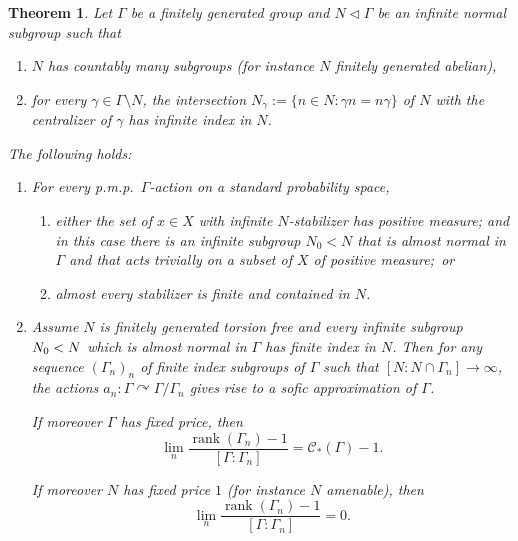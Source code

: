 \documentclass[10pt]{amsart}
\newtheorem{theo}[cdrthm]{Theorem}
\theoremstyle{definition}
\newcommand{\acting}{\curvearrowright}
\newcommand{\vraicost}{\mathscr{C}}
\DeclareMathOperator{\rank}{rank}
\newcommand{\pmp}{p.m.p.\ }
\newcommand*{\romanenumi}{\renewcommand*{\theenumi}{\roman{enumi}}}
\newcommand*{\alphenumi}{\renewcommand*{\theenumi}{\alph{enumi}}}
\begin{document}
\begin{theo}\label{th: normal subgr f subg --> rel Stuck-Zimmer}
Let $\Gamma$ be a finitely generated group and $N\triangleleft \Gamma$ be an infinite normal subgroup such that
\begin{enumerate}\alphenumi
\item \label{it : assumpt count many sbgr}
$N$ has countably many subgroups (for instance $N$ finitely generated abelian),
\item \label{cond: N and commut of gamma}
for every $\gamma\in \Gamma\setminus N$, the intersection $N_{\gamma}:=\{n\in N: \gamma n=n \gamma \}$ of $N$ with the centralizer of $\gamma$ has infinite index in $N$.
\end{enumerate}

The following holds:
\begin{enumerate}
\item\label{it: rel Stuck-Zimmer}
For every \pmp $\Gamma$-action on a standard probability space,
\begin{enumerate}\romanenumi
\item\label{it: inf normal subgr trivial act}
either the set of $x \in X$ with infinite $N$-stabilizer has positive measure; and in this case there is an infinite subgroup $N_0 < N$ that is almost normal in $\Gamma$ and that acts trivially on a subset of $X$ of positive measure;~or
\item\label{it: or act is free}
almost every stabilizer is finite and contained in $N$.
\end{enumerate}

\item\label{it: index on N to inft -> sofic}
Assume $N$ is finitely generated torsion free and every infinite subgroup $N_0\linebreak<N$ which is almost normal in $\Gamma$ has finite index in $N$. Then for any sequence $(\Gamma_n)_n$ of finite index subgroups of $\Gamma$ such that $[N:N\cap \Gamma_n]\to \infty$, the actions $a_n:\Gamma\acting \Gamma/\Gamma_n$ gives rise to a sofic approximation of $\Gamma$.

If moreover $\Gamma$ has fixed price, then
\begin{equation}
\lim_{n} \frac{
\rank (\Gamma_n)-1}{[\Gamma:\Gamma_n]}=\vraicost_*(\Gamma)-1.
\end{equation}

If moreover $N$ has fixed price $1$ (for instance $N$ amenable), then
\begin{equation}
\lim_{n} \frac{
\rank (\Gamma_n)-1}{ [\Gamma:\Gamma_n]}=0.
\end{equation}
\end{enumerate}
\end{theo}
\end{document}
